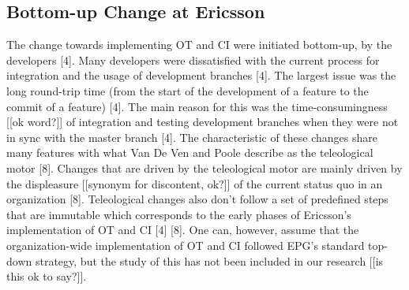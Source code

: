 \documentclass[fina_report_innit.tex]{subfiles}
\begin{document}
\subsection*{Bottom-up Change at Ericsson}
The change towards implementing OT and CI were initiated bottom-up, by the developers [4]. Many developers were dissatisfied with the current process for integration and the usage of development branches [4]. The largest issue was the long round-trip time (from the start of the development of a feature to the commit of a feature) [4]. The main reason for this was the time-consumingness [[ok word?]] of integration and testing development branches when they were not in sync with the master branch [4]. The characteristic of these changes share many features with what Van De Ven and Poole describe as the teleological motor [8]. Changes that are driven by the teleological motor are mainly driven by the displeasure [[synonym for discontent, ok?]] of the current status quo in an organization [8]. Teleological changes also don’t follow a set of predefined steps that are immutable which corresponds to the early phases of Ericsson’s implementation of OT and CI [4] [8]. One can, however, assume that the organization-wide implementation of OT and CI followed EPG’s standard top-down strategy, but the study of this has not been included in our research [[is this ok to say?]].
\end{document}
